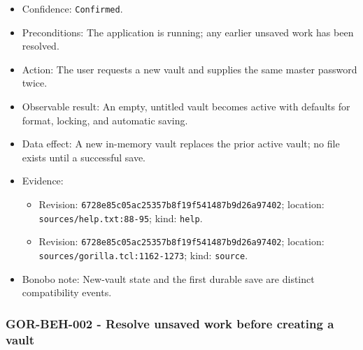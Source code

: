 \documentclass[
  letterpaper,
]{article}
\newcommand{\passthrough}[1]{#1}
\providecommand{\tightlist}{%
  \setlength{\itemsep}{0pt}\setlength{\parskip}{0pt}}
\begin{document}
\begin{itemize}
\tightlist
\item
  Confidence: \passthrough{\lstinline!Confirmed!}.
\item
  Preconditions: The application is running; any earlier unsaved work has been resolved.
\item
  Action: The user requests a new vault and supplies the same master password twice.
\item
  Observable result: An empty, untitled vault becomes active with defaults for format, locking, and automatic saving.
\item
  Data effect: A new in-memory vault replaces the prior active vault; no file exists until a successful save.
\item
  Evidence:

  \begin{itemize}
  \tightlist
  \item
    Revision: \nolinkurl{6728e85c05ac25357b8f19f541487b9d26a97402}; location: \nolinkurl{sources/help.txt:88-95}; kind:
    \passthrough{\lstinline!help!}.
  \item
    Revision: \nolinkurl{6728e85c05ac25357b8f19f541487b9d26a97402}; location: \nolinkurl{sources/gorilla.tcl:1162-1273};
    kind: \passthrough{\lstinline!source!}.
  \end{itemize}
\item
  Bonobo note: New-vault state and the first durable save are distinct compatibility events.
\end{itemize}

\subsubsection{GOR-BEH-002 - Resolve unsaved work before creating a
vault}\label{gor-beh-002---resolve-unsaved-work-before-creating-a-vault}
\end{document}
